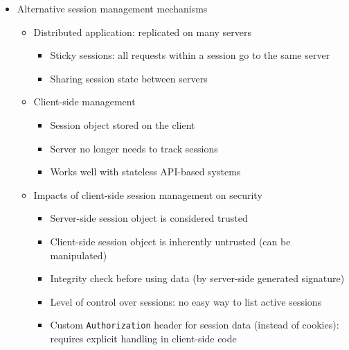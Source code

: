\documentclass[12pt,titlepage,a4paper]{report}
\begin{document}
\begin{itemize}
				\item Alternative session management mechanisms
				\begin{itemize}
					\item Distributed application: replicated on many servers
					\begin{itemize}
						\item Sticky sessions: all requests within a session go to the same server
						\item Sharing session state between servers
					\end{itemize}
					\item Client-side management
					\begin{itemize}
						\item Session object stored on the client
						\item Server no longer needs to track sessions
						\item Works well with stateless API-based systems
					\end{itemize}
					\item Impacts of client-side session management on security
					\begin{itemize}
						\item Server-side session object is considered trusted
						\item Client-side session object is inherently untrusted (can be manipulated)
						\item Integrity check before using data (by server-side generated signature)
						\item Level of control over sessions: no easy way to list active sessions
						\item Custom \texttt{Authorization} header for session data (instead of cookies): requires explicit handling in client-side code
					\end{itemize}
				\end{itemize}
			\end{itemize}
			
\end{document}
